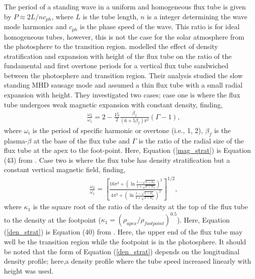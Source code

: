     The period of a standing wave in a uniform and homogeneous flux tube is given by $P \approx 2L/nc_{ph}$, where $L$ is the tube length, $n$ is a integer determining the wave mode harmonics and $c_{ph}$ is the phase speed of the wave.
    This ratio is for ideal homogeneous tubes, however, this is not the case for the solar atmosphere from the photosphere to the transition region.
    \citet{luna-cardozo} modelled the effect of density stratification and expansion with height of the flux tube on the ratio of the fundamental and first overtone periods for a vertical flux tube sandwiched between the photosphere and transition region.
    Their analysis studied the slow standing MHD sausage mode and assumed a thin flux tube with a small radial expansion with height. 
    They investigated two cases; case one is where the flux tube undergoes weak magnetic expansion with constant density, finding,  
    \begin{align}
        &&\frac{\omega_{2}}{\omega_{1}}= 2 - \frac{15}{2}\frac{\beta_{f}}{(6+5\beta_{f})\pi^{2}}(\Gamma-1),
        \label{mag_strat}
    \end{align}
    where $\omega_{i}$ is the period of specific harmonic or overtone (i.e., 1, 2), $\beta_{f}$ is the plasma-$\beta$ at the base of the flux tube and $\Gamma$ is the ratio of the radial size of the flux tube at the apex to the foot-point.
    Here, Equation (\ref{mag_strat}) is Equation (43) from \cite{luna-cardozo}.
    Case two is where the flux tube has density stratification but a constant vertical magnetic field, finding,
    \begin{align}
        &&\frac{\omega_{2}}{\omega_{1}}= \left[\frac{16\pi^{2} + \displaystyle\left(\ln\frac{1 - \sqrt{1 - \kappa_{1}}}{1 + \sqrt{1 - \kappa_{1}}}\right)^{2}}{4\pi^2 + \displaystyle\left(\ln\frac{1 - \sqrt{1 - \kappa_{1}}}{1 + \sqrt{1 - \kappa_{1}}}\right)^{2}} \right]^{1/2},
        \label{den_strat}
    \end{align} 
	where $\kappa_{1}$ is the square root of the ratio of the density at the top of the flux tube to the density at the footpoint ($\kappa_{1} = (\rho_{apex}/\rho_{footpoint})^{0.5}$).
    Here, Equation (\ref{den_strat}) is Equation (40) from \cite{luna-cardozo}.
    Here, the upper end of the flux tube may well be the transition region while the footpoint is in the photosphere.
    It should be noted that the form of Equation (\ref{den_strat}) depends on the longitudinal density profile; here,a density profile where the tube speed increased linearly with height was used.
 
